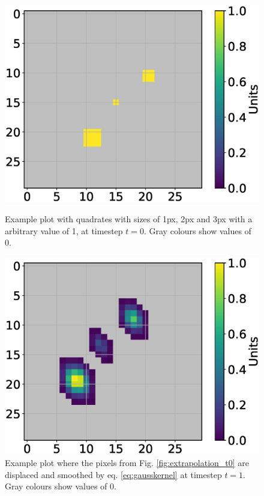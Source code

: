 \documentclass[11pt,twoside,a4paper,fleqn,x11names]{report}
\numberwithin{equation}{chapter}
\numberwithin{figure}{chapter}
\numberwithin{table}{chapter}
\begin{document}
\begin{figure}[!htbp]
	\centering
	\begin{minipage}{0.48\textwidth}
		\includegraphics[width=\textwidth,trim={38mm 0 10mm 5mm},clip]{Extrapolation_t0.eps}
		\caption{Example plot with quadrates with sizes of 1px, 2px and 3px with a arbitrary value of 1, at timestep $t=0$. Gray colours show values of 0.}
		\label{fig:extrapolation_t0}
	\end{minipage}\hfill
	\begin{minipage}{0.48\textwidth}
		\includegraphics[width=\textwidth,trim={38mm 0 10mm 5mm},clip]{Extrapolation_t1.eps}
		\caption{Example plot where the pixels from Fig. \ref{fig:extrapolation_t0} are displaced and smoothed by eq. \ref{eq:gausskernel} at timestep $t=1$. Gray colours show values of 0.}
		\label{fig:extrapolation_t1}
	\end{minipage}
\end{figure}
\FloatBarrier
\end{document}
